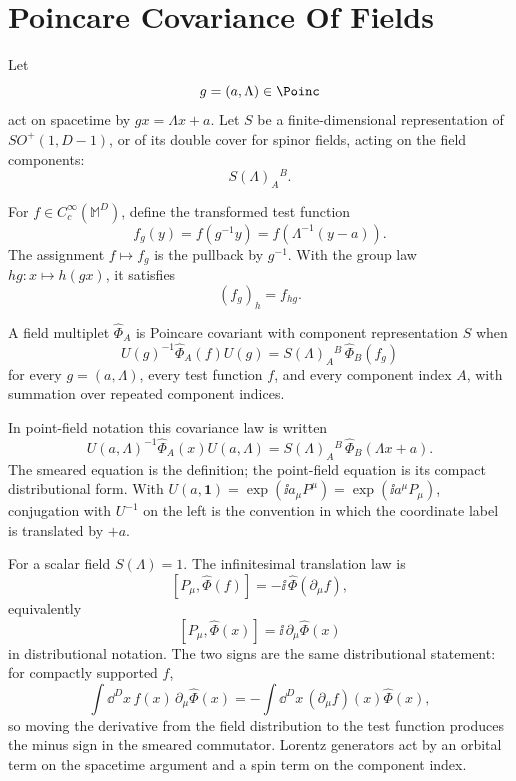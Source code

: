 \section{Poincare Covariance Of Fields}

Let
\[
  g=(a,\Lambda)\in \Poinc
\]
act on spacetime by \(gx=\Lambda x+a\). Let \(S\) be a finite-dimensional
representation of \(SO^+(1,D-1)\), or of its double cover for spinor fields,
acting on the field components:
\[
  S(\Lambda)_A{}^B.
\]

\begin{definition}
\label{def:poincare-pullback-test-functions}
For \(f\in C_c^\infty(\mathbb M^D)\), define the transformed test function
\[
  f_g(y)=f(g^{-1}y)=f(\Lambda^{-1}(y-a)).
\]
The assignment \(f\mapsto f_g\) is the pullback by \(g^{-1}\). With the group
law \(h g:x\mapsto h(gx)\), it satisfies
\[
  (f_g)_h=f_{hg}.
\]
\end{definition}

\begin{definition}
\label{def:covariant-field-multiplet}
A field multiplet \(\widehat\Phi_A\) is Poincare covariant with component
representation \(S\) when
\[
  U(g)^{-1}\widehat\Phi_A(f)U(g)
  =
  S(\Lambda)_A{}^B\,\widehat\Phi_B(f_g)
\]
for every \(g=(a,\Lambda)\), every test function \(f\), and every component
index \(A\), with summation over repeated component indices.
\end{definition}

In point-field notation this covariance law is written
\[
  U(a,\Lambda)^{-1}\widehat\Phi_A(x)U(a,\Lambda)
  =
  S(\Lambda)_A{}^B\,\widehat\Phi_B(\Lambda x+a).
\]
The smeared equation is the definition; the point-field equation is its compact
distributional form.  With
\(U(a,\mathbf 1)=\exp(\ii a_\mu P^\mu)=\exp(\ii a^\mu P_\mu)\), conjugation
with \(U^{-1}\) on the left is the convention in which the coordinate label is
translated by \(+a\).

For a scalar field \(S(\Lambda)=1\). The infinitesimal translation law is
\[
  [P_\mu,\widehat\Phi(f)]
  =
  -\ii\,\widehat\Phi(\partial_\mu f),
\]
equivalently
\[
  [P_\mu,\widehat\Phi(x)]
  =
  \ii\,\partial_\mu\widehat\Phi(x)
\]
in distributional notation.  The two signs are the same distributional
statement: for compactly supported \(f\),
\[
  \int \dd^Dx\,f(x)\,\partial_\mu\widehat\Phi(x)
  =
  -\int \dd^Dx\,(\partial_\mu f)(x)\widehat\Phi(x),
\]
so moving the derivative from the field distribution to the test function
produces the minus sign in the smeared commutator.  Lorentz generators act by
an orbital term on the spacetime argument and a spin term on the component
index.

